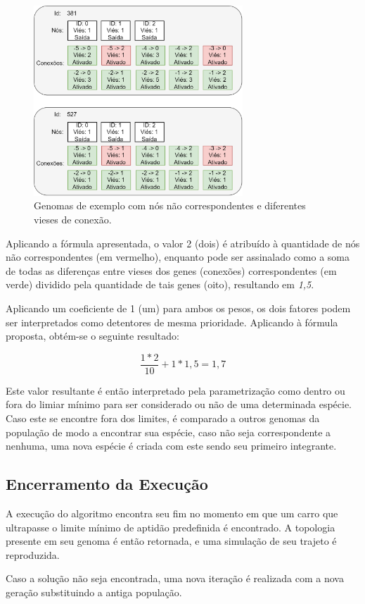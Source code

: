 \begin{figure}[htb]
        \centering
        \caption{\label{fig_NA}Genomas de exemplo com nós não correspondentes e diferentes vieses de conexão.}
        \includegraphics[width=0.7\textwidth]{images/NA.png}
\end{figure}

Aplicando a fórmula apresentada, o valor 2 (dois) é atribuído à quantidade
de nós não correspondentes (em vermelho), enquanto \textit{} pode ser
assinalado como a soma de todas as diferenças entre vieses dos genes (conexões)
correspondentes (em verde) dividido pela quantidade de tais genes (oito), resultando em \textit{1,5}.

Aplicando um coeficiente de 1 (um) para ambos os pesos, os dois fatores podem ser
interpretados como detentores de mesma prioridade. Aplicando à fórmula proposta, obtém-se o seguinte resultado:

\[ \frac{1 * 2}{10} + 1 * 1,5 = 1,7\]

Este valor resultante é então interpretado pela parametrização como dentro ou fora do
limiar mínimo para ser considerado ou não de uma determinada espécie. Caso este se
encontre fora dos limites, é comparado a outros genomas da população de modo a encontrar
sua espécie, caso não seja correspondente a nenhuma, uma nova espécie é criada com este sendo seu primeiro integrante.

\subsection{Encerramento da Execução}
A execução do algoritmo encontra seu fim no momento em que um carro
que ultrapasse o limite mínimo de aptidão predefinida é encontrado.
A topologia presente em seu genoma é então retornada, e uma simulação de seu trajeto é reproduzida.

Caso a solução não seja encontrada, uma nova iteração é realizada com a nova geração substituindo a antiga população.

